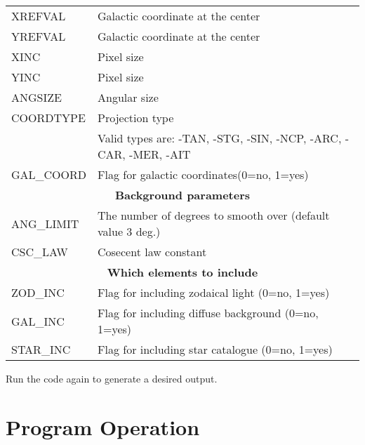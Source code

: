 \documentclass[12pt]{article}
\renewcommand{\i}{\item}
\def\i{\item}
\begin{document}
\begin{small_listing}
\begin{center}
\begin{tabular}{|l|l|}
\hline
XREFVAL    &   Galactic coordinate at the center\\
YREFVAL    &  Galactic coordinate at the center\\
XINC       &  Pixel size\\
YINC       &  Pixel size\\
ANGSIZE    &  Angular size\\
COORDTYPE  &  Projection type \\
           & Valid types are: -TAN, -STG, -SIN, -NCP, -ARC, -CAR, -MER, -AIT\\
GAL\_COORD  &  Flag for galactic coordinates(0=no, 1=yes)   \\
\hline
\multicolumn{2}{|c|}{\bf Background parameters}\\
\hline
ANG\_LIMIT  &  The number of degrees to smooth over (default value 3 deg.) \\
CSC\_LAW    &  Cosecent law constant\\
\hline
\multicolumn{2}{|c|}{\bf Which elements to include}\\
\hline
ZOD\_INC    &  Flag for including zodaical light (0=no, 1=yes) \\
GAL\_INC    &  Flag for including diffuse background (0=no, 1=yes) \\
STAR\_INC   &  Flag for including star catalogue (0=no, 1=yes) \\
\hline
\end{tabular}
\end{center}

\i Run the code again to generate a desired output.
\end{small_listing}

\newpage

\section{Program Operation}
\end{document}
